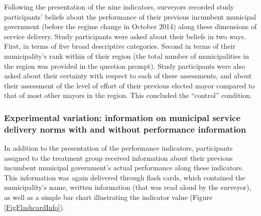 \documentclass[11pt]{article}
\begin{document}
Following the presentation of the nine indicators, surveyors recorded study participants' beliefs about the performance of their previous incumbent municipal government (before the regime change in October 2014) along these dimensions of service delivery. Study participants were asked about their beliefs in two ways. First, in terms of five broad descriptive categories. Second in terms of their municipality's rank within of their region (the total number of municipalities in the region was provided in the question prompt). Study participants were also asked about their certainty with respect to each of these assessments, and about their assessment of the level of effort of their previous elected mayor compared to that of most other mayors in the region. This concluded the ``control'' condition.

\subsubsection*{Experimental variation: information on municipal service delivery norms with and without performance information}

In addition to the presentation of the performance indicators, participants assigned to the treatment group received information about their previous incumbent municipal government's actual performance along these indicators. This information was again delivered through flash cards, which contained the municipality's name, written information (that was read aloud by the surveyor), as well as a simple bar chart illustrating the indicator value (Figure \ref{FigFlashcardInfo}).  
\end{document}
